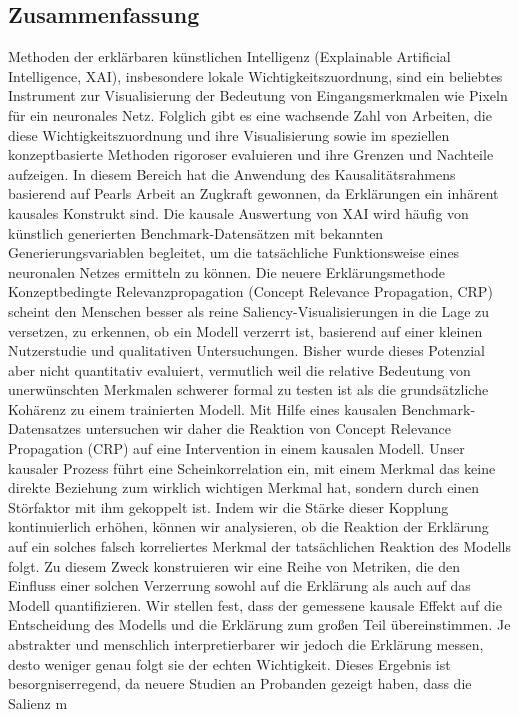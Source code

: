 %
\pagestyle{empty}

\subsection*{Zusammenfassung}
Methoden der erklärbaren künstlichen Intelligenz (Explainable Artificial Intelligence, XAI), insbesondere lokale Wichtigkeitszuordnung, sind ein beliebtes Instrument zur Visualisierung der Bedeutung von Eingangsmerkmalen wie Pixeln für ein neuronales Netz.
Folglich gibt es eine wachsende Zahl von Arbeiten, die diese Wichtigkeitszuordnung und ihre Visualisierung sowie im speziellen konzeptbasierte Methoden rigoroser evaluieren und ihre Grenzen und Nachteile aufzeigen. In diesem Bereich hat die Anwendung des Kausalitätsrahmens basierend auf Pearls Arbeit an Zugkraft gewonnen, da Erklärungen ein inhärent kausales Konstrukt sind. Die kausale Auswertung von XAI wird häufig von künstlich generierten Benchmark-Datensätzen mit bekannten Generierungsvariablen begleitet, um die tatsächliche Funktionsweise eines neuronalen Netzes ermitteln zu können. 
Die neuere Erklärungsmethode Konzeptbedingte Relevanzpropagation (Concept Relevance Propagation, CRP) scheint den Menschen besser als reine Saliency-Visualisierungen in die Lage zu versetzen, zu erkennen, ob ein Modell verzerrt ist, basierend auf einer kleinen Nutzerstudie und qualitativen Untersuchungen. Bisher wurde dieses Potenzial aber nicht quantitativ evaluiert, vermutlich weil die relative Bedeutung von unerwünschten Merkmalen schwerer formal zu testen ist als die grundsätzliche Kohärenz zu einem trainierten Modell. 
Mit Hilfe eines kausalen Benchmark-Datensatzes untersuchen wir daher die Reaktion von Concept Relevance Propagation (CRP) auf eine Intervention in einem kausalen Modell. 
Unser kausaler Prozess führt eine Scheinkorrelation ein, mit einem Merkmal das keine direkte Beziehung zum wirklich wichtigen Merkmal hat, sondern durch einen Störfaktor mit ihm gekoppelt ist. Indem wir die Stärke dieser Kopplung kontinuierlich erhöhen, können wir analysieren, ob die Reaktion der Erklärung auf ein solches falsch korreliertes Merkmal der tatsächlichen Reaktion des Modells folgt. Zu diesem Zweck konstruieren wir eine Reihe von Metriken, die den Einfluss einer solchen Verzerrung sowohl auf die Erklärung als auch auf das Modell quantifizieren. Wir stellen fest, dass der gemessene kausale Effekt auf die Entscheidung des Modells und die Erklärung zum großen Teil übereinstimmen. Je abstrakter und menschlich interpretierbarer wir jedoch die Erklärung messen, desto weniger genau folgt sie der echten Wichtigkeit. Dieses Ergebnis ist besorgniserregend, da neuere Studien an Probanden gezeigt haben, dass die Salienz m

